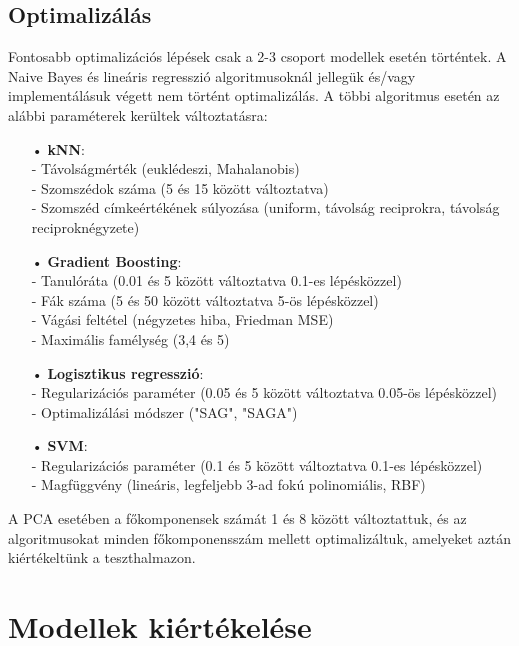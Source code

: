 \documentclass[12pt]{article}
\begin{document}
\subsection{Optimalizálás}



Fontosabb optimalizációs lépések csak a 2-3 csoport modellek esetén történtek. A Naive Bayes és lineáris regresszió algoritmusoknál jellegük és/vagy implementálásuk végett nem történt optimalizálás. A többi algoritmus esetén az alábbi paraméterek kerültek változtatásra:
\begin{itemize}
\item[•] \textbf{kNN}: \\
- Távolságmérték (euklédeszi, Mahalanobis) \\
- Szomszédok száma (5 és 15 között változtatva) \\
- Szomszéd címkeértékének súlyozása (uniform, távolság reciprokra, távolság reciproknégyzete) 
\item[•] \textbf{Gradient Boosting}: \\
- Tanulóráta (0.01 és 5 között változtatva 0.1-es lépésközzel)\\
- Fák száma (5 és 50 között változtatva 5-ös lépésközzel)\\
- Vágási feltétel (négyzetes hiba, Friedman MSE) \\
- Maximális famélység (3,4 és 5)
\item[•] \textbf{Logisztikus regresszió}: \\
- Regularizációs paraméter (0.05 és 5 között változtatva 0.05-ös lépésközzel) \\
- Optimalizálási módszer ("SAG", "SAGA") 
\item[•] \textbf{SVM}: \\
- Regularizációs paraméter (0.1 és 5 között változtatva 0.1-es lépésközzel)\\
- Magfüggvény (lineáris, legfeljebb 3-ad fokú polinomiális, RBF)
\end{itemize}A PCA esetében a főkomponensek számát 1 és 8 között változtattuk, és az algoritmusokat minden főkomponensszám mellett optimalizáltuk, amelyeket aztán kiértékeltünk a teszthalmazon.

\section{Modellek kiértékelése}




\begin{thebibliography}{9}
\end{thebibliography}
\end{document}
